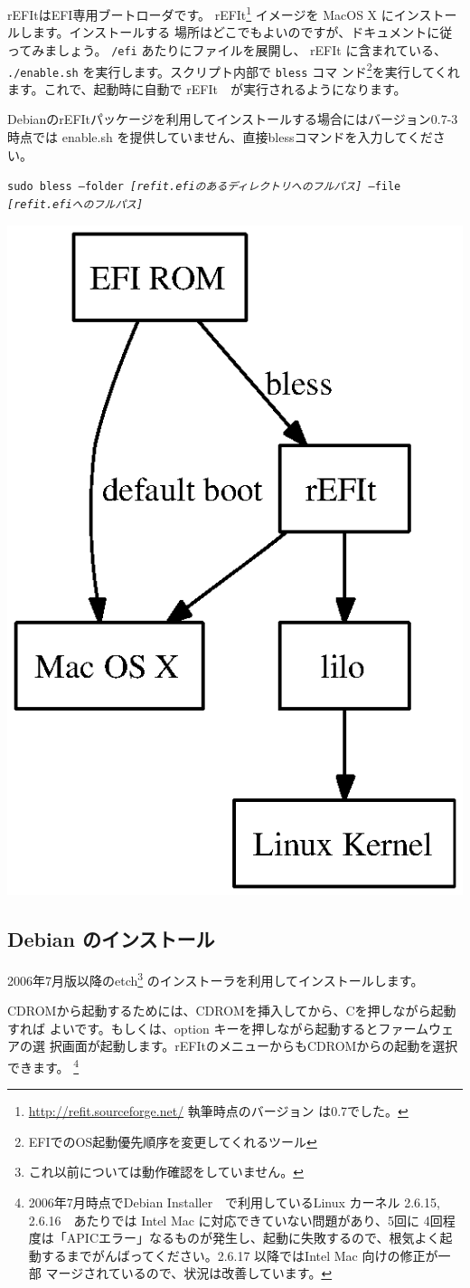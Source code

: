 \documentclass[mingoth,a4paper]{jsarticle}
\begin{document}
rEFItはEFI専用ブートローダです。
rEFIt\footnote{\url{http://refit.sourceforge.net/} 執筆時点のバージョン
は0.7でした。} イメージを MacOS X にインストールします。インストールする
場所はどこでもよいのですが、ドキュメントに従ってみましょう。
\texttt{/efi} あたりにファイルを展開し、 rEFIt に含まれている、
\texttt{./enable.sh} を実行します。スクリプト内部で \texttt{bless} コマ
ンド\footnote{EFIでのOS起動優先順序を変更してくれるツール}を実行してくれ
ます。これで、起動時に自動で rEFIt　が実行されるようになります。

DebianのrEFItパッケージを利用してインストールする場合にはバージョン0.7-3 
時点では enable.sh を提供していません、直接blessコマンドを入力してくださ
い。

\texttt{sudo bless --folder \textit{[refit.efiのあるディレクトリへのフルパス]} --file \textit{[refit.efiへのフルパス]}}

\begin{center}
  \includegraphics[width=0.5\hsize]{image200607/bootchain.ps}
\end{center}

\subsection{Debian のインストール}

2006年7月版以降のetch\footnote{これ以前については動作確認をしていません。} 
のインストーラを利用してインストールします。

CDROMから起動するためには、CDROMを挿入してから、Cを押しながら起動すれば
よいです。もしくは、option キーを押しながら起動するとファームウェアの選
択画面が起動します。rEFItのメニューからもCDROMからの起動を選択できます。
\footnote{2006年7月時点でDebian Installer　で利用しているLinux カーネル 
2.6.15, 2.6.16　あたりでは Intel Mac に対応できていない問題があり、5回に
4回程度は「APICエラー」なるものが発生し、起動に失敗するので、根気よく起
動するまでがんばってください。2.6.17 以降ではIntel Mac 向けの修正が一部
マージされているので、状況は改善しています。}
\end{document}
